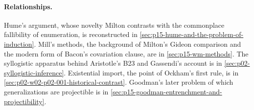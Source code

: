 \paragraph{Relationships.}
Hume's argument, whose novelty Milton contrasts with the commonplace
fallibility of enumeration, is reconstructed in
\cref{sec:p15-hume-and-the-problem-of-induction}. Mill's methods, the
background of Milton's Gideon comparison and the modern form of Bacon's
covariation clause, are in \cref{sec:p15-wm-methods}. The syllogistic
apparatus behind Aristotle's B23 and Gassendi's account is in
\cref{sec:p02-syllogistic-inference}. Existential import, the point of
Ockham's first rule, is in \cref{sec:p02-w02-p02-001-historical-contrast}.
Goodman's later problem of which generalizations are projectible is in
\cref{sec:p15-goodman-entrenchment-and-projectibility}.

